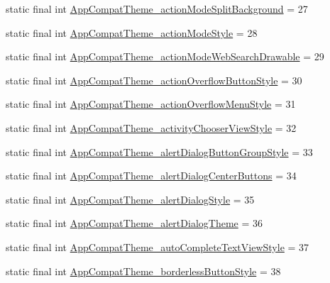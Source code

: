 \begin{DoxyCompactItemize}
\item 
static final int \mbox{\hyperlink{classandroid_1_1support_1_1design_1_1_r_1_1styleable_a002b6b7dd5b2a4e0bf171193481a7427}{App\+Compat\+Theme\+\_\+action\+Mode\+Split\+Background}} = 27
\item 
static final int \mbox{\hyperlink{classandroid_1_1support_1_1design_1_1_r_1_1styleable_aae6a4f503401f7efc9c94e43b01271a7}{App\+Compat\+Theme\+\_\+action\+Mode\+Style}} = 28
\item 
static final int \mbox{\hyperlink{classandroid_1_1support_1_1design_1_1_r_1_1styleable_add9905765c33ef54aeaaf390ae2195d1}{App\+Compat\+Theme\+\_\+action\+Mode\+Web\+Search\+Drawable}} = 29
\item 
static final int \mbox{\hyperlink{classandroid_1_1support_1_1design_1_1_r_1_1styleable_aa3f2417348f8b9486dcf6c577373fd21}{App\+Compat\+Theme\+\_\+action\+Overflow\+Button\+Style}} = 30
\item 
static final int \mbox{\hyperlink{classandroid_1_1support_1_1design_1_1_r_1_1styleable_a2e63c132db3b20cbc996a971b5deda6a}{App\+Compat\+Theme\+\_\+action\+Overflow\+Menu\+Style}} = 31
\item 
static final int \mbox{\hyperlink{classandroid_1_1support_1_1design_1_1_r_1_1styleable_a13b436eb02e31bcf51b5b3971354fd0e}{App\+Compat\+Theme\+\_\+activity\+Chooser\+View\+Style}} = 32
\item 
static final int \mbox{\hyperlink{classandroid_1_1support_1_1design_1_1_r_1_1styleable_a6dfecde95eb2fc3d2acf3a0a86c9d169}{App\+Compat\+Theme\+\_\+alert\+Dialog\+Button\+Group\+Style}} = 33
\item 
static final int \mbox{\hyperlink{classandroid_1_1support_1_1design_1_1_r_1_1styleable_ac2f3909b5317e1b2a41c18178be52941}{App\+Compat\+Theme\+\_\+alert\+Dialog\+Center\+Buttons}} = 34
\item 
static final int \mbox{\hyperlink{classandroid_1_1support_1_1design_1_1_r_1_1styleable_abad1f233fe2c6d34d702334fc703bd92}{App\+Compat\+Theme\+\_\+alert\+Dialog\+Style}} = 35
\item 
static final int \mbox{\hyperlink{classandroid_1_1support_1_1design_1_1_r_1_1styleable_a83269aab8e223466c81841ff2ce5304f}{App\+Compat\+Theme\+\_\+alert\+Dialog\+Theme}} = 36
\item 
static final int \mbox{\hyperlink{classandroid_1_1support_1_1design_1_1_r_1_1styleable_af8989d3616f2d90b9093e72b325da129}{App\+Compat\+Theme\+\_\+auto\+Complete\+Text\+View\+Style}} = 37
\item 
static final int \mbox{\hyperlink{classandroid_1_1support_1_1design_1_1_r_1_1styleable_a55cbb1dce6c77a69dc7cdbffde3c3109}{App\+Compat\+Theme\+\_\+borderless\+Button\+Style}} = 38

\end{DoxyCompactItemize}
